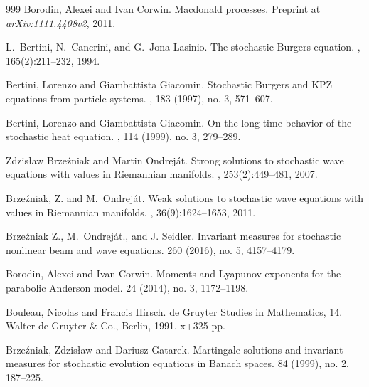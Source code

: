 \documentclass[a4paper,12pt]{article}
\theoremstyle{plain}
\theoremstyle{definition}
\begin{document}
\begin{thebibliography}{999}
Borodin, Alexei and Ivan Corwin.
\newblock Macdonald processes.
\newblock Preprint at {\em arXiv:1111.4408v2}, 2011.

L.~Bertini, N.~Cancrini, and G.~Jona-Lasinio.
\newblock The stochastic {B}urgers equation.
, 165(2):211--232, 1994.

Bertini, Lorenzo and Giambattista Giacomin.
\newblock Stochastic {B}urgers and {KPZ} equations from particle systems.
, 183 (1997), no. 3, 571--607.

Bertini, Lorenzo and Giambattista Giacomin.
\newblock On the long-time behavior of the stochastic heat equation.
, 114 (1999), no. 3, 279--289.

Zdzis{\l}aw Brze{\'z}niak and Martin Ondrej{\'a}t.
\newblock Strong solutions to stochastic wave equations with values in
  {R}iemannian manifolds.
, 253(2):449--481, 2007.

Brze{\'z}niak, Z. and M.~Ondrej{\'a}t.
\newblock Weak solutions to stochastic wave equations with values in
  {R}iemannian manifolds.
, 36(9):1624--1653, 2011.


Brze{\'z}niak Z., M.~Ondrej{\'a}t., and J. Seidler. 
\newblock Invariant measures for stochastic nonlinear beam and wave equations.
 260 (2016), no. 5, 4157--4179. 

Borodin, Alexei and Ivan Corwin.
\newblock Moments and Lyapunov exponents for the parabolic Anderson model.
 24 (2014), no. 3, 1172--1198.



Bouleau, Nicolas and Francis Hirsch.  
\newblock de Gruyter Studies in Mathematics, 14. Walter de Gruyter \& Co., Berlin, 1991. x+325 pp.

Brze{\'z}niak, Zdzis{\l}aw and  Dariusz Gatarek.
\newblock Martingale solutions and invariant measures for stochastic evolution equations in Banach spaces.  84 (1999), no. 2, 187--225. 



\end{thebibliography}
\end{document}
